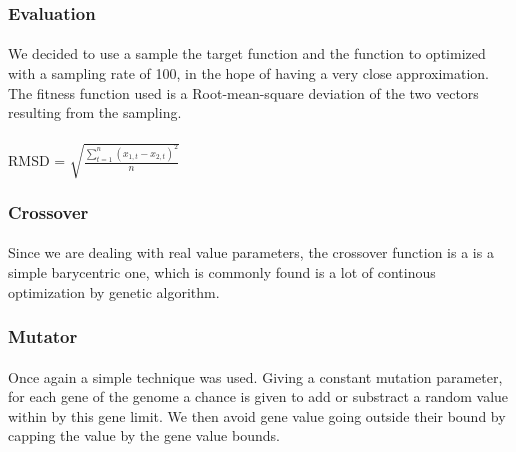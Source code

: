 \documentclass{article}
\begin{document}

    \subsubsection{Evaluation} %
    \label{ssub:Evaluation}
      
      \paragraph{} %
      \label{par:}
        We decided to use a sample the target function and the function to optimized
        with a sampling rate of 100, in the hope of having a very close approximation. 
        The fitness function used is a Root-mean-square deviation of the two vectors
        resulting from the sampling.
        \\
        \\
        RMSD = $\sqrt{\frac{\sum_{t=1}^n (x_{1,t} - x_{2,t})^2}{n}}$

    
    \subsubsection{Crossover} %
    \label{ssub:Crossover}
      
      \paragraph{} %
      \label{par:}
      
        Since we are dealing with real value parameters, the crossover function is a
        is a simple barycentric one, which is commonly found is a lot of continous
        optimization by genetic algorithm.

    
    
    \subsubsection{Mutator} %
    \label{ssub:Mutator}
    
      \paragraph{} %
      \label{par:}
        Once again a simple technique was used. Giving a constant mutation parameter,
        for each gene of the genome a chance is given to add or substract a random value
        within by this gene limit. We then avoid gene value going outside their bound by
        capping the value by the gene value bounds.
\end{document}
